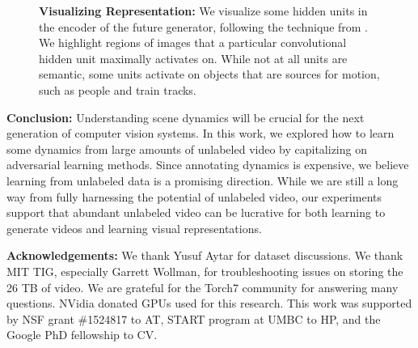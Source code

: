 \documentclass{article}
\begin{document}
\begin{figure}
    \centering
    \hspace{1em}
    \vspace{-0.5em}
    \caption{\textbf{Visualizing Representation:} We visualize some hidden units in the encoder of the future generator, following the technique from \cite{zhou2014object}. We highlight regions of images that a particular convolutional hidden unit maximally activates on. While not at all units are semantic, some units activate on objects that are sources for motion, such as  people and train tracks.}
    \label{fig:emergence}
    \vspace{-1.5em}
\end{figure}


\textbf{Conclusion:} Understanding scene dynamics will be crucial for the next generation of computer vision
systems. In this work, we explored how to learn some dynamics from large amounts of unlabeled video by capitalizing on adversarial learning methods. Since annotating dynamics is expensive, we believe learning from unlabeled data is a promising direction. While we are still a long way from fully harnessing the potential of unlabeled video, our experiments support that abundant unlabeled video can be lucrative for both learning to generate videos and learning visual representations. 

{
\small
\textbf{Acknowledgements:} We thank Yusuf Aytar for dataset discussions. We thank MIT TIG, especially Garrett Wollman, for troubleshooting issues on storing the 26 TB of video. We are grateful for the Torch7 community for answering many questions. NVidia donated GPUs used for this research. This work was supported by NSF grant \#1524817 to AT, START program at UMBC to HP, and the Google PhD fellowship to CV.
}

{


}
\end{document}
